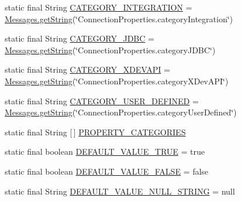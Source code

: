 \begin{DoxyCompactItemize}
\item 
static final String \mbox{\hyperlink{classcom_1_1mysql_1_1cj_1_1conf_1_1_property_definitions_aa9398d608369cffd2c424ff284483971}{C\+A\+T\+E\+G\+O\+R\+Y\+\_\+\+I\+N\+T\+E\+G\+R\+A\+T\+I\+ON}} = \mbox{\hyperlink{classcom_1_1mysql_1_1cj_1_1_messages_a86a388448aa7759254c491b3e1320d31}{Messages.\+get\+String}}(\char`\"{}Connection\+Properties.\+category\+Integration\char`\"{})
\item 
static final String \mbox{\hyperlink{classcom_1_1mysql_1_1cj_1_1conf_1_1_property_definitions_a88eab12a7f3cde3aaeca00f792216e80}{C\+A\+T\+E\+G\+O\+R\+Y\+\_\+\+J\+D\+BC}} = \mbox{\hyperlink{classcom_1_1mysql_1_1cj_1_1_messages_a86a388448aa7759254c491b3e1320d31}{Messages.\+get\+String}}(\char`\"{}Connection\+Properties.\+category\+J\+D\+BC\char`\"{})
\item 
static final String \mbox{\hyperlink{classcom_1_1mysql_1_1cj_1_1conf_1_1_property_definitions_a0c9bd68e444b77acdd6685513976774e}{C\+A\+T\+E\+G\+O\+R\+Y\+\_\+\+X\+D\+E\+V\+A\+PI}} = \mbox{\hyperlink{classcom_1_1mysql_1_1cj_1_1_messages_a86a388448aa7759254c491b3e1320d31}{Messages.\+get\+String}}(\char`\"{}Connection\+Properties.\+category\+X\+Dev\+A\+PI\char`\"{})
\item 
static final String \mbox{\hyperlink{classcom_1_1mysql_1_1cj_1_1conf_1_1_property_definitions_a1702133644f27d3c99c87e67b9e91cac}{C\+A\+T\+E\+G\+O\+R\+Y\+\_\+\+U\+S\+E\+R\+\_\+\+D\+E\+F\+I\+N\+ED}} = \mbox{\hyperlink{classcom_1_1mysql_1_1cj_1_1_messages_a86a388448aa7759254c491b3e1320d31}{Messages.\+get\+String}}(\char`\"{}Connection\+Properties.\+category\+User\+Defined\char`\"{})
\item 
static final String \mbox{[}$\,$\mbox{]} \mbox{\hyperlink{classcom_1_1mysql_1_1cj_1_1conf_1_1_property_definitions_a742da93b1bca37dd245dd58e330a5173}{P\+R\+O\+P\+E\+R\+T\+Y\+\_\+\+C\+A\+T\+E\+G\+O\+R\+I\+ES}}
\item 
static final boolean \mbox{\hyperlink{classcom_1_1mysql_1_1cj_1_1conf_1_1_property_definitions_a5f6e4c945876e8ed885723aa970c8657}{D\+E\+F\+A\+U\+L\+T\+\_\+\+V\+A\+L\+U\+E\+\_\+\+T\+R\+UE}} = true
\item 
static final boolean \mbox{\hyperlink{classcom_1_1mysql_1_1cj_1_1conf_1_1_property_definitions_a8d3e25a9a34071df7a2e92d5c0ae5310}{D\+E\+F\+A\+U\+L\+T\+\_\+\+V\+A\+L\+U\+E\+\_\+\+F\+A\+L\+SE}} = false
\item 
static final String \mbox{\hyperlink{classcom_1_1mysql_1_1cj_1_1conf_1_1_property_definitions_ab95dd1be294c242110f51178e452c465}{D\+E\+F\+A\+U\+L\+T\+\_\+\+V\+A\+L\+U\+E\+\_\+\+N\+U\+L\+L\+\_\+\+S\+T\+R\+I\+NG}} = null

\end{DoxyCompactItemize}
